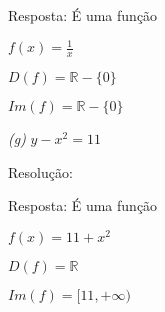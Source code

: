 \documentclass[12 pt, openright, twoside, a4paper, english, french, spanish, brazil]{abntex2}
\begin{document}
Resposta: É uma função

$f(x) = \frac{1}{x}$ 

$D(f) = \mathbb{R} - \{0\}$

$Im(f) = \mathbb{R} - \{0\}$
\bigskip

\textit{(g)} $y - x^2 = 11$

Resolução:


Resposta: É uma função

$f(x) = 11 + x^2$ 

$D(f) = \mathbb{R}$

$Im(f) = [11,+\infty)$
\bigskip
\end{document}
